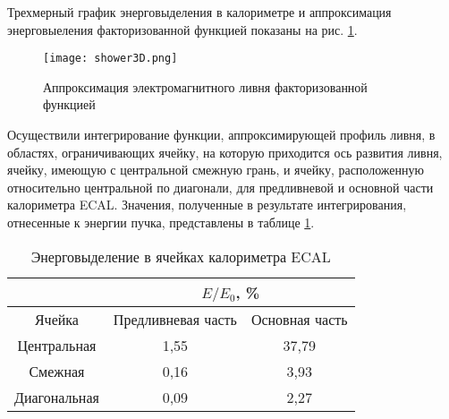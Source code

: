  Трехмерный график энерговыделения в калориметре и аппроксимация энерговыеления факторизованной функцией показаны на рис. \ref{fig:shower3D}.

\begin{figure}[H]
    \centering
    \texttt{[image: shower3D.png]}
    \caption{ Аппроксимация электромагнитного ливня факторизованной функцией }
    \label{fig:shower3D}
\end{figure}

Осуществили интегрирование функции, аппроксимирующей профиль ливня, в областях, ограничивающих  ячейку, на которую приходится ось развития ливня, ячейку, имеющую с центральной смежную грань, и ячейку, расположенную относительно центральной по диагонали, для предливневой и основной части калориметра ECAL. Значения, полученные в результате интегрирования, отнесенные к энергии пучка, представлены в таблице \ref{tab:enFrac}.

\begin{table}[H]
\centering
\caption{Энерговыделение в ячейках калориметра ECAL}
\label{tab:enFrac}
\begin{tabular}{|c|c|c|}
\hline
            & \multicolumn{2}{c|}{$E/E_0$, \%}        \\ \hline
Ячейка      & Предливневая часть & Основная часть \\ \hline
Центральная & 1,55               & 37,79          \\ \hline
Смежная     & 0,16               & 3,93           \\ \hline
Диагональная     & 0,09               & 2,27           \\ \hline
\end{tabular}
\end{table}